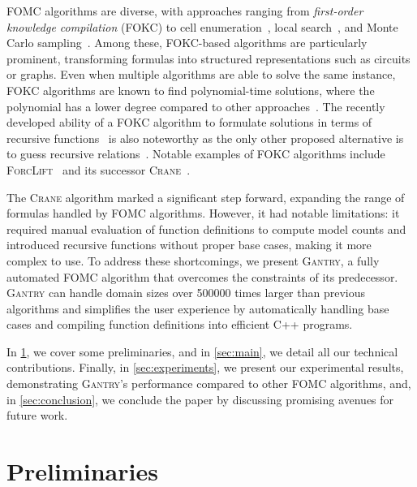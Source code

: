 \documentclass[a4paper,UKenglish,cleveref, autoref, thm-restate]{lipics-v2021}
\newcommand{\Cranetwo}{\textsc{Gantry}}
\begin{document}

FOMC algorithms are diverse, with approaches ranging from \emph{first-order
  knowledge compilation} (FOKC) to cell
enumeration~\cite{DBLP:conf/uai/BremenK21}, local
search~\cite{DBLP:journals/pvldb/NiuRDS11}, and Monte Carlo
sampling~\cite{DBLP:journals/cacm/GogateD16}. Among these, FOKC-based algorithms
are particularly prominent, transforming formulas into structured
representations such as circuits or graphs. Even when multiple algorithms are
able to solve the same instance, FOKC algorithms are known to find
polynomial-time solutions, where the polynomial has a lower degree compared to
other approaches~\cite{DBLP:conf/kr/DilkasB23}. The recently developed ability
of a FOKC algorithm to formulate solutions in terms of recursive
functions~\cite{DBLP:conf/kr/DilkasB23} is also noteworthy as the only other
proposed alternative is to guess recursive
relations~\cite{DBLP:conf/ilp/BarvinekB0ZK21}. Notable examples of FOKC
algorithms include \textsc{ForcLift}~\cite{DBLP:conf/ijcai/BroeckTMDR11} and its
successor \textsc{Crane}~\cite{DBLP:conf/kr/DilkasB23}.


The \textsc{Crane} algorithm marked a significant step forward, expanding the
range of formulas handled by FOMC algorithms. However, it had notable
limitations: it required manual evaluation of function definitions to compute
model counts and introduced recursive functions without proper base cases,
making it more complex to use. To address these shortcomings, we present
\Cranetwo{}, a fully automated FOMC algorithm that overcomes the constraints of
its predecessor. \Cranetwo{} can handle domain sizes over \num{500000} times
larger than previous algorithms and simplifies the user experience by
automatically handling base cases and compiling function definitions into
efficient C++ programs.

In \cref{sec:preliminaries}, we cover some preliminaries, and in
\cref{sec:main}, we detail all our technical contributions. Finally, in
\cref{sec:experiments}, we present our experimental results, demonstrating
\Cranetwo{}'s performance compared to other FOMC algorithms, and, in
\cref{sec:conclusion}, we conclude the paper by discussing promising avenues for
future work.

\section{Preliminaries}\label{sec:preliminaries}
\end{document}
